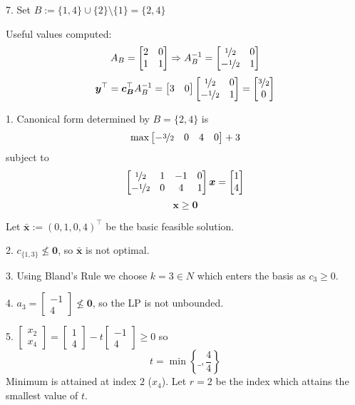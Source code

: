 7. Set $ B:=\{1,4\}\cup \{2\}\setminus\{1\}=\{2,4\} $


Useful values computed:
\[ A_B=
\begin{bmatrix}
    2 & 0\\
    1 & 1\\
\end{bmatrix} \Rightarrow
A_B^{-1}=
\begin{bmatrix}
    \nicefrac{1}{2} & 0\\
    -\nicefrac{1}{2} & 1\\
\end{bmatrix} \]
\[ \bm{y}^\top=\bm{c_B}^\top A_B^{-1}=
\begin{bmatrix}
    3 & 0
\end{bmatrix}
\begin{bmatrix}
    \nicefrac{1}{2} & 0\\
    -\nicefrac{1}{2} & 1\\
\end{bmatrix}=
\begin{bmatrix}
    \nicefrac{3}{2} \\
    0
\end{bmatrix}\]

1. Canonical form determined by $ B=\{2,4\} $ is
\[ \max 
\begin{bmatrix}
    -\nicefrac{3}{2} & 0 & 4 & 0
\end{bmatrix} + 3\]
subject to
\[ 
\begin{bmatrix}
    \nicefrac{1}{2} & 1 & -1 & 0\\
    -\nicefrac{1}{2} & 0 & 4 & 1
\end{bmatrix}\bm{x}=
\begin{bmatrix}
    1\\
    4
\end{bmatrix}
\]
\[ \bm{x}\ge \bm{0} \]

Let $ \bm{\bar{x}}:=(0,1,0,4)^\top $ be the basic feasible solution.

2. $ c_{\{1,3\}} \nleq \bm{0} $, so $ \bm{\bar{x}} $ is not optimal.

3. Using Bland's Rule we choose $ k=3\in N $ which enters the basis
as $ c_3\ge 0 $.

4.
$ 
a_3= \begin{bmatrix}
    -1\\
    4
\end{bmatrix}\nleq \bm{0}
$,
so the LP is not unbounded.

5.
$
\begin{bmatrix}
    x_2\\
    x_4
\end{bmatrix}
=
\begin{bmatrix}
    1\\
    4
\end{bmatrix}-t
\begin{bmatrix}
    -1\\
    4
\end{bmatrix}\ge 0
$
so
\[ t=\min \left\{\_,\frac{4}{4} \right\} \]
Minimum is attained at index $ 2 $ ($ x_4 $). Let $ r=2 $ be the index which attains the smallest value of $ t $.

